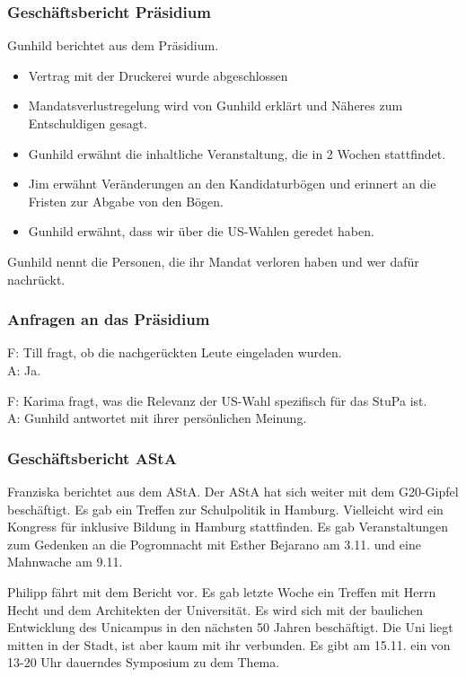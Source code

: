 \documentclass[ngerman,headheight=70pt]{scrartcl}
\begin{document}
    \subsubsection{Geschäftsbericht Präsidium}

    Gunhild berichtet aus dem Präsidium.

    \begin{itemize}
        \item Vertrag mit der Druckerei wurde abgeschlossen
        \item Mandatsverlustregelung wird von Gunhild erklärt und Näheres zum Entschuldigen
      gesagt.
        \item Gunhild erwähnt die inhaltliche Veranstaltung, die in 2 Wochen stattfindet.
        \item Jim erwähnt Veränderungen an den Kandidaturbögen und erinnert an die Fristen
      zur Abgabe von den Bögen.
        \item Gunhild erwähnt, dass wir über die US-Wahlen geredet haben.
    \end{itemize}

    Gunhild nennt die Personen, die ihr Mandat verloren haben und wer dafür nachrückt.

    \subsubsection{Anfragen an das Präsidium}

    F: Till fragt, ob die nachgerückten Leute eingeladen wurden. \\
    A: Ja.

    F: Karima fragt, was die Relevanz der US-Wahl spezifisch für das StuPa
    ist. \\
    A: Gunhild antwortet mit ihrer persönlichen Meinung.

    \subsubsection{Geschäftsbericht AStA}

    Franziska berichtet aus dem AStA. Der AStA hat sich weiter mit dem G20-Gipfel
    beschäftigt. Es gab ein Treffen zur Schulpolitik in Hamburg. Vielleicht wird
    ein Kongress für inklusive Bildung in Hamburg stattfinden. Es gab Veranstaltungen
    zum Gedenken an die Pogromnacht mit Esther Bejarano am 3.11. und eine Mahnwache
    am 9.11.

    Philipp fährt mit dem Bericht vor. Es gab letzte Woche ein Treffen mit Herrn
    Hecht und dem Architekten der Universität. Es wird sich mit der baulichen
    Entwicklung des Unicampus in den nächsten 50 Jahren beschäftigt. Die Uni liegt
    mitten in der Stadt, ist aber kaum mit ihr verbunden. Es gibt am 15.11. ein
    von 13-20 Uhr dauerndes Symposium zu dem Thema.
\end{document}
